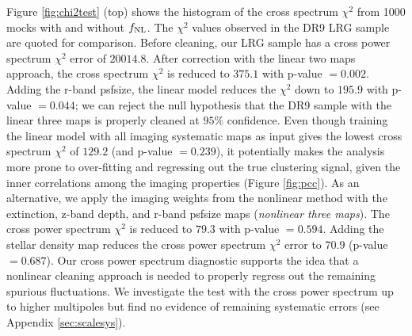 Figure \ref{fig:chi2test} (top)  shows the histogram of the cross spectrum $\chi^{2}$ from 1000 mocks with and without $f_{\rm NL}$. The $\chi^{2}$ values observed in the DR9 LRG sample are quoted for comparison. Before cleaning, our LRG sample has a cross power spectrum $\chi^{2}$ error of $20014.8$. After correction with the linear two maps approach, the cross spectrum $\chi^{2}$ is reduced to $375.1$ with p-value $=0.002$. Adding the r-band psfsize, the linear model reduces the $\chi^{2}$ down to $195.9$ with p-value $=0.044$; we can reject the null hypothesis that the DR9 sample with the linear three maps is properly cleaned at $95\%$ confidence. Even though training the linear model with all imaging systematic maps as input gives the lowest cross spectrum $\chi^{2}$ of $129.2$ (and p-value $=0.239$), it potentially makes the analysis more prone to over-fitting and regressing out the true clustering signal, given the inner correlations among the imaging properties (Figure \ref{fig:pcc}). As an alternative, we apply the imaging weights from the nonlinear method with the extinction, z-band depth, and r-band psfsize maps (\textit{nonlinear three maps}). The cross power spectrum $\chi^{2}$ is reduced to $79.3$ with p-value $=0.594$.  Adding the stellar density map reduces the cross power spectrum $\chi^{2}$ error to $70.9$ (p-value $=0.687$). Our cross power spectrum diagnostic supports the idea that a nonlinear cleaning approach is needed to properly regress out the remaining spurious fluctuations. We investigate the test with the cross power spectrum up to higher multipoles but find no evidence of remaining systematic errors (see Appendix \ref{sec:scalesys}). 

